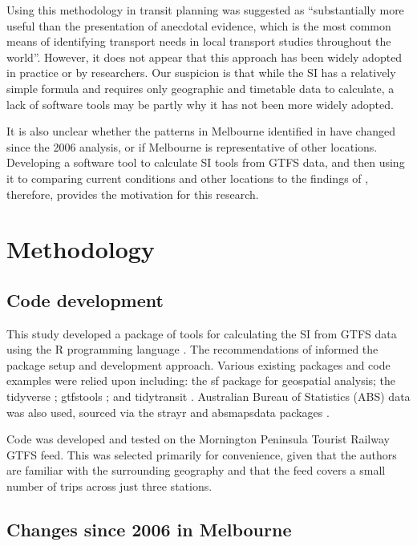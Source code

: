 \documentclass[preprint, 3p,
authoryear]{elsarticle} %
\begin{document}
Using this methodology in transit planning was suggested as
``substantially more useful than the presentation of anecdotal evidence,
which is the most common means of identifying transport needs in local
transport studies throughout the world''\citep{currie2010identifying}.
However, it does not appear that this approach has been widely adopted
in practice or by researchers. Our suspicion is that while the SI has a
relatively simple formula and requires only geographic and timetable
data to calculate, a lack of software tools may be partly why it has not
been more widely adopted.

It is also unclear whether the patterns in Melbourne identified in
\citet{currie2010identifying} have changed since the 2006 analysis, or
if Melbourne is representative of other locations. Developing a software
tool to calculate SI tools from GTFS data, and then using it to
comparing current conditions and other locations to the findings of
\citet{currie2010identifying}, therefore, provides the motivation for
this research.

\section{Methodology}\label{methodology}

\subsection{Code development}\label{code-development}

This study developed a package of tools for calculating the SI from GTFS
data using the R programming language \citep{R-base}. The
recommendations of \citet{wickham2023r} informed the package setup and
development approach. Various existing packages and code examples were
relied upon including: the sf package \citep{R-sf} for geospatial
analysis; the tidyverse \citep{tidyverse2019}; gtfstools
\citep{R-gtfstools}; and tidytransit \citep{R-tidytransit}. Australian
Bureau of Statistics (ABS) data was also used, sourced via the strayr
and absmapsdata packages \citep{r-strayr}.

Code was developed and tested on the Mornington Peninsula Tourist
Railway GTFS feed. This was selected primarily for convenience, given
that the authors are familiar with the surrounding geography and that
the feed covers a small number of trips across just three stations.

\subsection{Changes since 2006 in
Melbourne}\label{changes-since-2006-in-melbourne}
\end{document}
